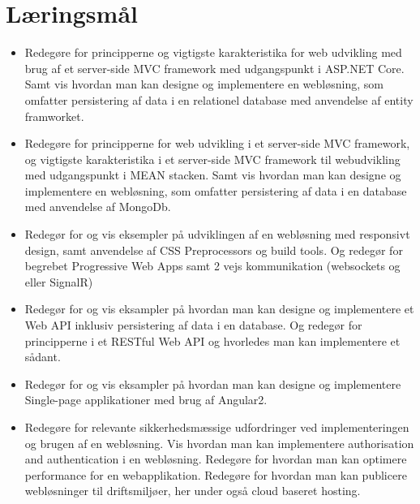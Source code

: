 \section*{Læringsmål}

\begin{itemize}
	
	\item 
	Redegøre for principperne og vigtigste karakteristika for web udvikling med brug af et server-side MVC framework med udgangspunkt i ASP.NET Core. Samt vis hvordan man kan designe og implementere en webløsning, som omfatter persistering af data i en relationel database med anvendelse af entity framworket.
	
	\item 
	Redegøre for principperne for web udvikling i et server-side MVC framework, og vigtigste karakteristika i et server-side MVC framework til webudvikling med udgangspunkt i MEAN stacken. Samt vis hvordan man kan designe og implementere en webløsning, som omfatter persistering af data i en database med anvendelse af MongoDb.
	
	\item 
	Redegør for og vis eksempler på udviklingen af en webløsning med responsivt design, samt anvendelse af CSS Preprocessors og build tools. Og redegør for begrebet Progressive Web Apps samt 2 vejs kommunikation (websockets og eller SignalR)
	
	\item 
	Redegør for og vis eksampler på hvordan man kan designe og implementere et Web API inklusiv persistering af data i en database. Og redegør for principperne i et RESTful Web API og hvorledes man kan implementere et sådant.
	
	\item 
	Redegør for og vis eksampler på hvordan man kan designe og implementere Single-page applikationer med brug af Angular2.
	
	\item 
	Redegøre for relevante sikkerhedsmæssige udfordringer ved implementeringen og brugen af en webløsning. Vis hvordan man kan implementere authorisation and authentication i en webløsning. Redegøre for hvordan man kan optimere performance for en webapplikation. Redegøre for hvordan man kan publicere webløsninger til driftsmiljøer, her under også cloud baseret hosting.
\end{itemize}